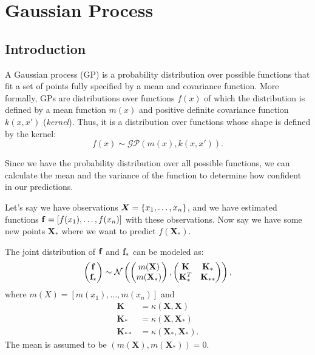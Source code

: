 \chapter{Gaussian Process}

\section{Introduction}
\label{sec:gaussian_process}
A Gaussian process (GP) is a probability distribution over possible functions that fit a set of points fully specified by a mean and covariance function. More formally, GPs are distributions over functions $f(x)$ of which the distribution is defined by a mean function $m(x)$ and positive definite covariance function $k(x,x')$ (\ie \textit{kernel}). Thus, it is a distribution over functions whose shape is defined by the kernel:
$$f(x) \sim \mathcal{GP}(m(x),k(x,x')).$$

Since we have the probability distribution over all possible functions, we can calculate the mean and the variance of the function to determine how confident in our predictions.

Let's say we have observations ${\bm{X}}=\{x_1, \dots, x_n\}$, and we have estimated functions ${\mathbf{f}} = [f(x_1), \dots, f(x_n)]$ with these observations. Now say we have some new points $\mathbf{X}_*$ where we want to predict $f(\mathbf{X}_*)$.

The joint distribution of ${\mathbf{f}}$ and ${\mathbf{f}}_*$ can be modeled as:
\begin{align*}
	\begin{pmatrix}
		{\mathbf{f}}\\
		{\mathbf{f}}_*
		\end{pmatrix}\sim \mathcal{N} 
		\begin{pmatrix}
		\begin{pmatrix}
			m(\mathbf{X})\\
			m(\mathbf{X}_*)
		\end{pmatrix},
		\begin{pmatrix}
			\mathbf{K} & \mathbf{K}_*\\
			\mathbf{K}_*^T & \mathbf{K}_{**}
		\end{pmatrix}
		\end{pmatrix},
\end{align*}
where $m(X) = [m(x_1),\dots, m(x_n)]$ and
\begin{align*}
	\mathbf{K }&= \kappa(\mathbf{X,X})\\
	\mathbf{K}_* &= \kappa(\mathbf{X},\mathbf{X}_*)\\
	\mathbf{K}_{**} &= \kappa(\mathbf{X}_*,\mathbf{X}_*).
\end{align*}
The mean is assumed to be $(m(\mathbf{X}), m(\mathbf{X}_*))=0$. 

